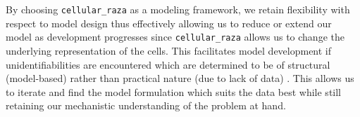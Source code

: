 \documentclass[10pt,letterpaper]{article}
\begin{document}
By choosing \texttt{cellular\_raza} \cite{Pleyer2025} as a modeling framework, we retain flexibility
with respect to model design thus effectively allowing us to reduce or extend our model as
development progresses since \texttt{cellular\_raza} allows us to change the underlying
representation of the cells.
This facilitates model development if unidentifiabilities are encountered which are determined to be
of structural (model-based) rather than practical nature (due to lack of data) \cite{Heinrich2025}.
This allows us to iterate and find the model formulation which suits the data best while still
retaining our mechanistic understanding of the problem at hand.

%
%
%
\end{document}
